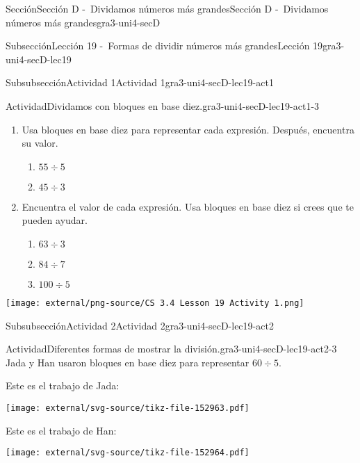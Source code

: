 \documentclass[twoside,10pt,]{article}
\begin{document}
\begin{sectionptx}{Sección}{Sección D -~Dividamos números más grandes}{}{Sección D -~Dividamos números más grandes}{}{}{gra3-uni4-secD}
\begin{subsectionptx}{Subsección}{Lección 19 -~Formas de dividir números más grandes}{}{Lección 19}{}{}{gra3-uni4-secD-lec19}
\begin{subsubsectionptx}{Subsubsección}{Actividad 1}{}{Actividad 1}{}{}{gra3-uni4-secD-lec19-act1}
\begin{activity}{Actividad}{Dividamos con bloques en base diez.}{gra3-uni4-secD-lec19-act1-3}
\begin{sidebyside}{2}{0}{0.1}{0}%
\begin{sbspanel}{0.7}%
%
\begin{enumerate}
\item{}Usa bloques en base diez para representar cada expresión. Después, encuentra su valor.%
%
\begin{enumerate}
\item{}\(\displaystyle 55 \div 5\)%
\item{}\(\displaystyle 45 \div 3\)%
\end{enumerate}
\item{}Encuentra el valor de cada expresión. Usa bloques en base diez si crees que te pueden ayudar.%
%
\begin{enumerate}
\item{}\(\displaystyle 63 \div 3\)%
\item{}\(\displaystyle 84 \div 7\)%
\item{}\(\displaystyle 100 \div 5\)%
\end{enumerate}
\end{enumerate}
\end{sbspanel}%
\begin{sbspanel}{0.2}%
\texttt{[image: external/png-source/CS 3.4 Lesson 19 Activity 1.png]}
\end{sbspanel}%
\end{sidebyside}%
\end{activity}%
\end{subsubsectionptx}
%
%
\typeout{************************************************}
\typeout{************************************************}
%
\begin{subsubsectionptx}{Subsubsección}{Actividad 2}{}{Actividad 2}{}{}{gra3-uni4-secD-lec19-act2}
\begin{activity}{Actividad}{Diferentes formas de mostrar la división.}{gra3-uni4-secD-lec19-act2-3}%
Jada y Han usaron bloques en base diez para representar \(60 \div 5\).%
\par
Este es el trabajo de Jada:%
\begin{image}{0}{1}{0}{}%
\texttt{[image: external/svg-source/tikz-file-152963.pdf]}
\end{image}%
Este es el trabajo de Han:%
\begin{image}{0}{1}{0}{}%
\texttt{[image: external/svg-source/tikz-file-152964.pdf]}
\end{image}%
%
\begin{enumerate}

\end{enumerate}
\end{activity}
\end{subsubsectionptx}
\end{subsectionptx}
\end{sectionptx}
\end{document}
